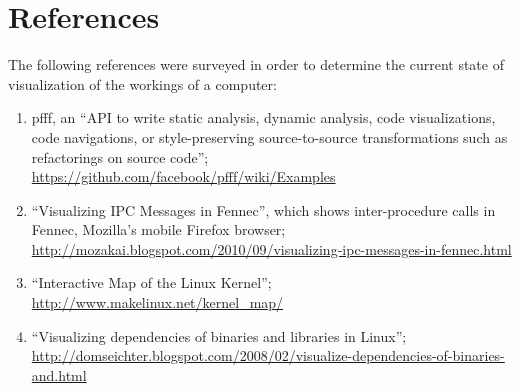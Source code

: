 \documentclass[12pt]{article}
\begin{document}
\section{References}
The following references were surveyed in order to determine the
current state of visualization of the workings of a computer:

\begin{enumerate}
\item pfff, an ``API to write static analysis, dynamic analysis, code
  visualizations, code navigations, or style-preserving
  source-to-source transformations such as refactorings on source
  code''; \url{https://github.com/facebook/pfff/wiki/Examples}
\item ``Visualizing IPC Messages in Fennec'', which shows
  inter-procedure calls in Fennec, Mozilla's mobile Firefox browser;\\
  \url{http://mozakai.blogspot.com/2010/09/visualizing-ipc-messages-in-fennec.html}
\item ``Interactive Map of the Linux Kernel'';
  \url{http://www.makelinux.net/kernel_map/}
\item ``Visualizing dependencies of binaries and libraries in Linux'';\\
  \url{http://domseichter.blogspot.com/2008/02/visualize-dependencies-of-binaries-and.html}
\end{enumerate}
\end{document}
